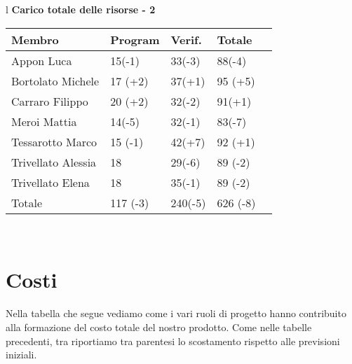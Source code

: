 \begin{table}[hbtp]
\large{
\begin{tabular}{l}
\Large{\textbf{\textsf{Carico totale delle risorse - 2}}} \\

\begin{tabular}{||p{3.5cm}||p{2cm}||p{2cm}||p{2cm}||p{2cm}||}
\hline
\textbf{Membro} & \textbf{Program} & \textbf{Verif.} & \textbf{Totale}\\
\hline
{Appon Luca}&15\footnotesize{(-1)}&33\footnotesize{(-3)}&88\footnotesize{(-4)} \\ 
\hline 
{Bortolato Michele} &17 \footnotesize{(+2)}&37\footnotesize{(+1)}&95 \footnotesize{(+5)}\\ 
\hline
{Carraro Filippo}&20 \footnotesize{(+2)}&32\footnotesize{(-2)}&91\footnotesize{(+1)} \\
\hline
{Meroi Mattia}&14\footnotesize{(-5)}&32\footnotesize{(-1)}&83\footnotesize{(-7)}\\
\hline
{Tessarotto Marco} &15 \footnotesize{(-1)}&42\footnotesize{(+7)}&92 \footnotesize{(+1)}\\
\hline
{Trivellato Alessia} &18&29\footnotesize{(-6)}&89 \footnotesize{(-2)} \\
\hline
{Trivellato Elena} &18&35\footnotesize{(-1)}&89 \footnotesize{(-2)} \\
\hline
{Totale} &117 \footnotesize{(-3)}&240\footnotesize{(-5)}&626 \footnotesize{(-8)} \\
\hline

\end{tabular} \\
\end{tabular}
}
\end{table}

\chapter{Costi}
Nella tabella che segue vediamo come i vari ruoli di progetto hanno contribuito alla formazione del costo totale del nostro prodotto. Come nelle tabelle precedenti, tra riportiamo tra parentesi lo scostamento rispetto alle previsioni iniziali.\\

